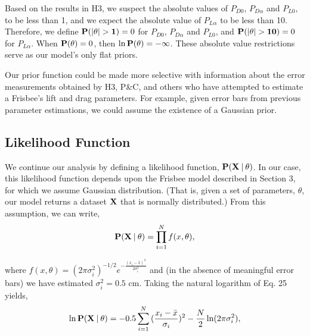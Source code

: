 \documentclass[a4paper,12pt, oneside]{article}
\newcommand\givenbase[1][]{\:#1\lvert\:}
\let\given\givenbase
\begin{document}
Based on the results in H3, we suspect the absolute values of $P_{D0}$, $P_{D\alpha}$ and $P_{L0}$, to be less than 1, and we expect the absolute value of $P_{L\alpha}$ to be less than 10. Therefore, we define $\bold{P(\left|\theta\right|>1)}=0$ for $P_{D0}$, $P_{D\alpha}$ and $P_{L0}$, and $\bold{P(\left|\theta\right|>10)}=0$ for $P_{L\alpha}$. When  $\bold{P(\theta)}=0$, then $\ln\bold{P(\theta)}=-\infty$. These absolute value restrictions serve as our model's only flat priors.

Our prior function could be made more selective with information about the error measurements obtained by H3, P\&C, and others who have attempted to estimate a Frisbee's lift and drag parameters. For example, given error bars from previous parameter estimations, we could assume the existence of a Gaussian prior. 
\subsection{Likelihood Function}
\color{red}
We continue our analysis by defining a likelihood function, $\bold{P({X}\given\theta})$. In our case, this likelihood function depends upon the Frisbee model described in Section 3, for which we assume Gaussian distribution. (That is, given a set of parameters, $\theta$, our model returns a dataset $\bold{X}$ that is normally distributed.) From this assumption, we can write, 
\begin{equation}
\bold{P({X}\given\theta)}={\prod_{i=1}^{N} f(x,\theta)},
\end{equation}

where $f(x,\theta)=(2\pi\sigma_{i}^2)^{-1/2}e^{-\frac{(x_{i}-\bar{x})^2}{2\sigma_i^2}}$ and (in the absence of meaningful error bars) we have estimated $\sigma_i^2=0.5$ cm. Taking the natural logarithm of Eq. 25 yields,
\begin{equation}
\ln\bold{P({X}\given\theta)}={-0.5 \sum_{i=1}^{N} {(\frac { x_i-\bar{x} } {\sigma_{i}}})^2} - \frac{N}{2}\ln(2\pi\sigma_{i}^2),
\end{equation}

\color{BurntOrange}
\end{document}
